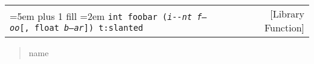 \documentclass{book}
\newcommand\Texinfocommandstyletextvar[1]{{\normalfont{}\textsl{#1}}}%
\renewcommand{\_}{\Texinfounderscore\discretionary{}{}{}}
\begin{document}
%

\noindent\begin{tabularx}{\linewidth}{@{}Xr}
\rightskip=5em plus 1 fill \hangindent=2em \hyphenpenalty=10000
\texttt{int foobar (\texttt{\textsl{i{-}{-}nt}}\ \Texinfocommandstyletextvar{f---oo}[,\ float\ \Texinfocommandstyletextvar{b--ar}])\ t:slanted}& [Library Function]
\end{tabularx}

%
\begin{quote}
\unskip{\parskip=0pt\noindent}%
name
\end{quote}
\end{document}
